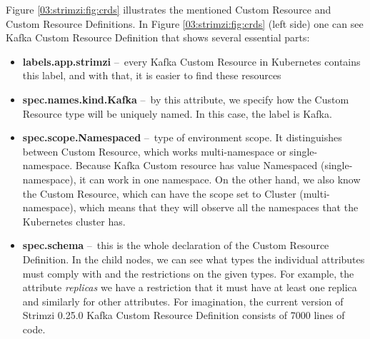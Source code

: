 Figure \ref{03:strimzi:fig:crds} illustrates the mentioned Custom Resource and Custom Resource Definitions. In Figure \ref{03:strimzi:fig:crds} (left side) one can see Kafka Custom Resource Definition that shows several essential parts:
\begin{itemize}[itemsep=1mm, parsep=0pt]
    \item \textbf{labels.app.strimzi}  \---\ every Kafka Custom Resource in Kubernetes contains this label, and with that, it is easier to find these resources
    \item \textbf{spec.names.kind.Kafka} \---\ by this attribute, we specify how the Custom Resource type will be uniquely named. In this case, the label is Kafka.
    \item \textbf{spec.scope.Namespaced} \---\ type of environment scope. It distinguishes between Custom Resource, which works multi-namespace or single-namespace. Because Kafka Custom resource has value Namespaced (single-namespace), it can work in one namespace. On the other hand, we also know the Custom Resource, which can have the scope set to Cluster (multi-namespace), which means that they will observe all the namespaces that the Kubernetes cluster has.
    \item \textbf{spec.schema} \---\ this is the whole declaration of the Custom Resource Definition. In the child nodes, we can see what types the individual attributes must comply with and the restrictions on the given types. For example, the attribute \emph{replicas} we have a restriction that it must have at least one replica and similarly for other attributes. For imagination, the current version of Strimzi 0.25.0 Kafka Custom Resource Definition consists of 7000 lines of code.
\end{itemize}


